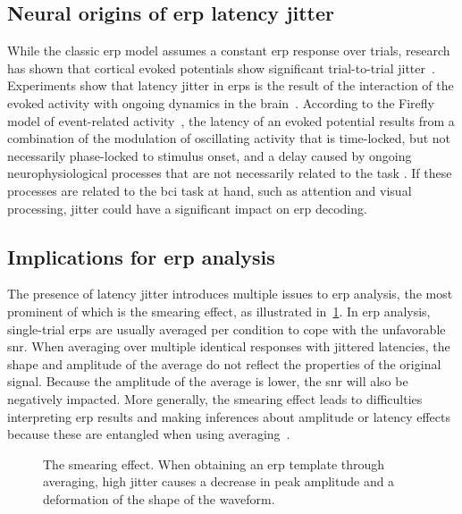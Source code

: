 \subsection{Neural origins of \acs{erp} latency jitter}
While the classic \ac{erp} model assumes a constant \ac{erp} response over trials,
research has shown that cortical evoked potentials show significant
trial-to-trial jitter~\cite{Truccolo2002}.
Experiments show that latency jitter in \acp{erp} is the result of the interaction of
the evoked activity with ongoing dynamics in the brain~\cite{Hasenstaub2007,
	Kisley1999, Curto2009, Arieli1996}.
According to the Firefly model of event-related activity~\cite{Burgess2012},
the latency of an evoked potential results from a combination of the modulation
of oscillating activity that is time-locked, but not necessarily phase-locked to stimulus onset,
and a delay caused by ongoing neurophysiological processes that are not necessarily related to the task
\cite{Stokes2016,Mouraux2008}.
If these processes are related to the \ac{bci} task at hand, such as attention
and visual processing, jitter could have a significant impact on \ac{erp}
decoding.

\subsection{Implications for \acs{erp} analysis}

The presence of latency jitter introduces multiple issues to \ac{erp} analysis, the
most prominent of which is the smearing effect, as illustrated
in~\cref{fig:wcble/smearing}. In \ac{erp} analysis, single-trial \acp{erp} are usually
averaged per condition to cope with the unfavorable \ac{snr}.
When averaging over multiple identical responses with jittered latencies, the shape
and amplitude of the average do not reflect the properties
of the original signal.
Because the amplitude of the average is lower, the \ac{snr} will also be negatively impacted.
More generally, the smearing effect leads to difficulties interpreting \ac{erp}
results and making inferences about amplitude or latency effects because these
are entangled when using averaging~\cite{Luck2014}.

\begin{figure}
  \centering
  
  \caption[The smearing effect.]{The smearing effect. When obtaining an \ac{erp} template through
  averaging, high jitter causes a decrease in peak amplitude and a deformation
  of the shape of the waveform.}
  \label{fig:wcble/smearing}
\end{figure}

